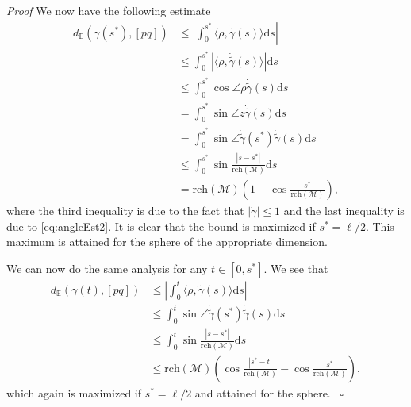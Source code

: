 \documentclass{article}
\newenvironment{proof}[1][{}]{%
  \begin{trivlist}\item[]\textit{Proof #1}\quad}%
  {\hfill\hspace*{\fill}~$\square$\end{trivlist}}
\newcommand{\ud}{\mathrm{d}}
\newcommand{\M}{\mathcal{M}}
\newcommand{\rch}{\mathrm{rch}}
\begin{document}
\begin{proof}
We now have the following estimate
\begin{align}
d_{\mathbb{E}}(\gamma(s^*) , [pq]) & \leq  \left| \int_{0}^{s^*} \langle  \rho, \dot{\tilde{\gamma}}(s) \rangle \ud s \right| 
\nonumber
\\ 
&
\leq  \int_{0}^{s^*} |\langle  \rho, \dot{\tilde{\gamma}}(s) \rangle | \ud s  
\nonumber
\\
&
\leq \int_{0}^{s^*} \cos \angle \rho \dot{\tilde{\gamma}}(s) \ud s
\nonumber
\\
&
= \int_{0}^{s^*} \sin \angle z \dot{\tilde{\gamma}}(s) \ud s
\nonumber
\\
&
= \int_{0}^{s^*} \sin \angle \dot{\tilde{\gamma}}(s^*) \dot{\tilde{\gamma}}(s) \ud s
\nonumber
\\
&
\leq \int_{0}^{s^*} \sin \frac{|s-s^*| } {\rch(\M)}  \ud s
\nonumber
\\
& 
= \rch(\M)
 \left (1-\cos \frac{s^* } {\rch(\M)}  \right ),
\nonumber
\end{align}
where the third inequality is due to the fact that $|\dot{\gamma }|\leq 1$ and the last inequality is due to \eqref{eq:angleEst2}. It is clear that the bound is maximized if $s^*=\ell/2$. This maximum is attained for the sphere of the appropriate dimension. 

We can now do the same analysis for any $t \in [0 ,s^*]$. We see that 
\begin{align}
d_{\mathbb{E}}(\gamma(t)  , [pq]) & \leq  \left| \int_{0}^{t } \langle  \rho, \dot{\tilde{\gamma}}(s) \rangle \ud s \right| 
\nonumber
\\
&
\leq \int_{0}^{t} \sin \angle \dot{\tilde{\gamma}}(s^*) \dot{\tilde{\gamma}}(s) \ud s
\nonumber
\\
&
\leq \int_{0}^{t} \sin \frac{|s-s^*| } {\rch(\M)}  \ud s
\nonumber
\\
& 
\leq \rch(\M)
 \left ( \cos \frac{|s^*-t| } {\rch(\M)} -\cos \frac{s^* } {\rch(\M)} \right ),
\nonumber
\end{align}
which again is maximized if $s^*=\ell/2$ and attained for the sphere.
\end{proof}
\end{document}
